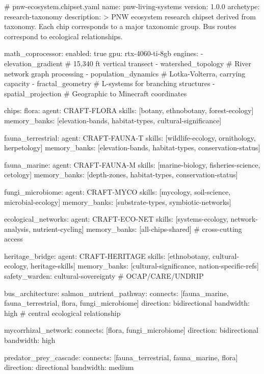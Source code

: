 \documentclass[11pt,letterpaper]{article}
\begin{document}
\begin{asciibox}
# pnw-ecosystem.chipset.yaml
name: pnw-living-systems
version: 1.0.0
archetype: research-taxonomy
description: >
  PNW ecosystem research chipset derived from taxonomy.
  Each chip corresponds to a major taxonomic group.
  Bus routes correspond to ecological relationships.

math_coprocessor:
  enabled: true
  gpu: rtx-4060-ti-8gb
  engines:
    - elevation_gradient    # 15,340 ft vertical transect
    - watershed_topology    # River network graph processing
    - population_dynamics   # Lotka-Volterra, carrying capacity
    - fractal_geometry      # L-systems for branching structures
    - spatial_projection    # Geographic to Minecraft coordinates

chips:
  flora:
    agent: CRAFT-FLORA
    skills: [botany, ethnobotany, forest-ecology]
    memory_banks: [elevation-bands, habitat-types, cultural-significance]

  fauna_terrestrial:
    agent: CRAFT-FAUNA-T
    skills: [wildlife-ecology, ornithology, herpetology]
    memory_banks: [elevation-bands, habitat-types, conservation-status]

  fauna_marine:
    agent: CRAFT-FAUNA-M
    skills: [marine-biology, fisheries-science, cetology]
    memory_banks: [depth-zones, habitat-types, conservation-status]

  fungi_microbiome:
    agent: CRAFT-MYCO
    skills: [mycology, soil-science, microbial-ecology]
    memory_banks: [substrate-types, symbiotic-networks]

  ecological_networks:
    agent: CRAFT-ECO-NET
    skills: [systems-ecology, network-analysis, nutrient-cycling]
    memory_banks: [all-chips-shared]    # cross-cutting access

  heritage_bridge:
    agent: CRAFT-HERITAGE
    skills: [ethnobotany, cultural-ecology, heritage-skills]
    memory_banks: [cultural-significance, nation-specific-refs]
    safety_warden: cultural-sovereignty  # OCAP/CARE/UNDRIP

bus_architecture:
  salmon_nutrient_pathway:
    connects: [fauna_marine, fauna_terrestrial, flora, fungi_microbiome]
    direction: bidirectional
    bandwidth: high  # central ecological relationship

  mycorrhizal_network:
    connects: [flora, fungi_microbiome]
    direction: bidirectional
    bandwidth: high

  predator_prey_cascade:
    connects: [fauna_terrestrial, fauna_marine, flora]
    direction: directional
    bandwidth: medium


\end{asciibox}
\end{document}
